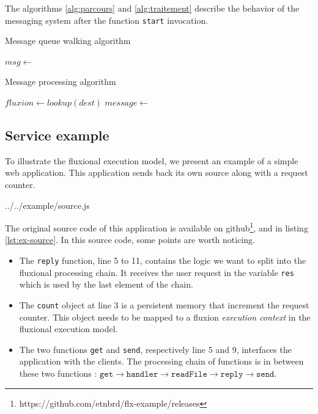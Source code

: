 The algorithms \ref{alg:parcours} and \ref{alg:traitement} describe the behavior of the messaging system after the function \texttt{start} invocation.

\begin{algorithm}
\caption{Message queue walking algorithm}
\label{alg:parcours}
\begin{algorithmic}
\State $msg \gets$  
\State {}
\EndWhile
\EndFunction
\end{algorithmic}
\end{algorithm}

\begin{algorithm}
\caption{Message processing algorithm}
\label{alg:traitement}
\begin{algorithmic}
\State $fluxion \gets lookup(dest)$
\State $message \gets$  
\State {} 
\EndFor
\EndFunction
\end{algorithmic}
\end{algorithm}

\subsection{Service example}

To illustrate the fluxional execution model, we present an example of a simple web application.
This application sends back its own source along with a request counter.

{../../example/source.js}

The original source code of this application is available on github\cite{flx-example}\footnote{\raggedright https://github.com/etnbrd/flx-example/releases}, and in listing \ref{lst:ex-source}.
In this source code, some points are worth noticing.

\begin{itemize}
  \item The \texttt{reply} function, line 5 to 11, contains the logic we want to split into the fluxional processing chain.
  It receives the user request in the variable \texttt{res} which is used by the last element of the chain.
  \item The \texttt{count} object at line 3 is a persistent memory that increment the request counter.
  This object needs to be mapped to a fluxion \textit{execution context} in the fluxional execution model.
  \item The two functions \texttt{get} and \texttt{send}, respectively line 5 and 9, interfaces the application with the clients.
  The processing chain of functions is in between these two functions : $\texttt{get} \to \texttt{handler} \to \texttt{readFile} \to \texttt{reply} \to \texttt{send}$.
\end{itemize}

